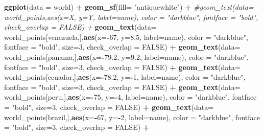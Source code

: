 \documentclass[12pt,oneside]{reedthesis}
\newenvironment{Shaded}{\begin{snugshade}}{\end{snugshade}}
\newcommand{\CommentTok}[1]{\textcolor[rgb]{0.56,0.35,0.01}{\textit{#1}}}
\newcommand{\DataTypeTok}[1]{\textcolor[rgb]{0.13,0.29,0.53}{#1}}
\newcommand{\DecValTok}[1]{\textcolor[rgb]{0.00,0.00,0.81}{#1}}
\newcommand{\FloatTok}[1]{\textcolor[rgb]{0.00,0.00,0.81}{#1}}
\newcommand{\KeywordTok}[1]{\textcolor[rgb]{0.13,0.29,0.53}{\textbf{#1}}}
\newcommand{\NormalTok}[1]{#1}
\newcommand{\OperatorTok}[1]{\textcolor[rgb]{0.81,0.36,0.00}{\textbf{#1}}}
\newcommand{\OtherTok}[1]{\textcolor[rgb]{0.56,0.35,0.01}{#1}}
\newcommand{\StringTok}[1]{\textcolor[rgb]{0.31,0.60,0.02}{#1}}
\begin{document}
\begin{Shaded}
\begin{Highlighting}[]
\KeywordTok{ggplot}\NormalTok{(}\DataTypeTok{data =}\NormalTok{ world) }\OperatorTok{+}\StringTok{ }
\StringTok{  }\KeywordTok{geom_sf}\NormalTok{(}\DataTypeTok{fill=} \StringTok{"antiquewhite"}\NormalTok{) }\OperatorTok{+}\StringTok{ }
\StringTok{  }\CommentTok{#geom_text(data= world_points,aes(x=X, y=Y, label=name), color = "darkblue", fontface = "bold", check_overlap = FALSE) +}
\StringTok{  }\KeywordTok{geom_text}\NormalTok{(}\DataTypeTok{data=}\NormalTok{ world_points[venezuela,],}\KeywordTok{aes}\NormalTok{(}\DataTypeTok{x=}\OperatorTok{-}\DecValTok{67}\NormalTok{, }\DataTypeTok{y=}\FloatTok{8.5}\NormalTok{, }\DataTypeTok{label=}\NormalTok{name), }\DataTypeTok{color =} \StringTok{"darkblue"}\NormalTok{, }\DataTypeTok{fontface =} \StringTok{"bold"}\NormalTok{, }\DataTypeTok{size=}\DecValTok{3}\NormalTok{, }\DataTypeTok{check_overlap =} \OtherTok{FALSE}\NormalTok{) }\OperatorTok{+}
\StringTok{  }\KeywordTok{geom_text}\NormalTok{(}\DataTypeTok{data=}\NormalTok{ world_points[panama,],}\KeywordTok{aes}\NormalTok{(}\DataTypeTok{x=}\OperatorTok{-}\FloatTok{79.2}\NormalTok{, }\DataTypeTok{y=}\FloatTok{9.2}\NormalTok{, }\DataTypeTok{label=}\NormalTok{name), }\DataTypeTok{color =} \StringTok{"darkblue"}\NormalTok{, }\DataTypeTok{fontface =} \StringTok{"bold"}\NormalTok{, }\DataTypeTok{size=}\DecValTok{3}\NormalTok{, }\DataTypeTok{check_overlap =} \OtherTok{FALSE}\NormalTok{) }\OperatorTok{+}\StringTok{ }
\StringTok{  }\KeywordTok{geom_text}\NormalTok{(}\DataTypeTok{data=}\NormalTok{ world_points[ecuador,],}\KeywordTok{aes}\NormalTok{(}\DataTypeTok{x=}\OperatorTok{-}\FloatTok{78.2}\NormalTok{, }\DataTypeTok{y=}\OperatorTok{-}\DecValTok{1}\NormalTok{, }\DataTypeTok{label=}\NormalTok{name), }\DataTypeTok{color =} \StringTok{"darkblue"}\NormalTok{, }\DataTypeTok{fontface =} \StringTok{"bold"}\NormalTok{, }\DataTypeTok{size=}\DecValTok{3}\NormalTok{, }\DataTypeTok{check_overlap =} \OtherTok{FALSE}\NormalTok{) }\OperatorTok{+}
\StringTok{  }\KeywordTok{geom_text}\NormalTok{(}\DataTypeTok{data=}\NormalTok{ world_points[peru,],}\KeywordTok{aes}\NormalTok{(}\DataTypeTok{x=}\OperatorTok{-}\DecValTok{75}\NormalTok{, }\DataTypeTok{y=}\OperatorTok{-}\DecValTok{4}\NormalTok{, }\DataTypeTok{label=}\NormalTok{name), }\DataTypeTok{color =} \StringTok{"darkblue"}\NormalTok{, }\DataTypeTok{fontface =} \StringTok{"bold"}\NormalTok{, }\DataTypeTok{size=}\DecValTok{3}\NormalTok{, }\DataTypeTok{check_overlap =} \OtherTok{FALSE}\NormalTok{) }\OperatorTok{+}
\StringTok{  }\KeywordTok{geom_text}\NormalTok{(}\DataTypeTok{data=}\NormalTok{ world_points[brazil,],}\KeywordTok{aes}\NormalTok{(}\DataTypeTok{x=}\OperatorTok{-}\DecValTok{67}\NormalTok{, }\DataTypeTok{y=}\OperatorTok{-}\DecValTok{2}\NormalTok{, }\DataTypeTok{label=}\NormalTok{name), }\DataTypeTok{color =} \StringTok{"darkblue"}\NormalTok{, }\DataTypeTok{fontface =} \StringTok{"bold"}\NormalTok{, }\DataTypeTok{size=}\DecValTok{3}\NormalTok{, }\DataTypeTok{check_overlap =} \OtherTok{FALSE}\NormalTok{) }\OperatorTok{+}

\end{Highlighting}
\end{Shaded}
\end{document}
